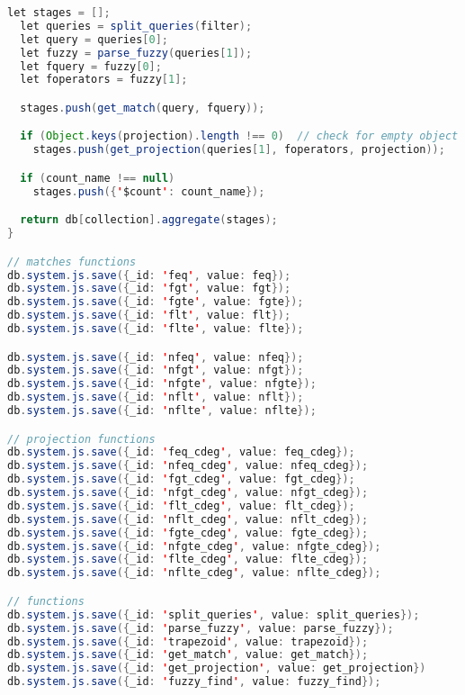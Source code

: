 \begin{lstlisting}[language=java, escapechar=|]
  let stages = [];
  let queries = split_queries(filter);
  let query = queries[0];
  let fuzzy = parse_fuzzy(queries[1]);
  let fquery = fuzzy[0];
  let foperators = fuzzy[1];

  stages.push(get_match(query, fquery));

  if (Object.keys(projection).length !== 0)  // check for empty object
    stages.push(get_projection(queries[1], foperators, projection));

  if (count_name !== null)
    stages.push({'$count': count_name});

  return db[collection].aggregate(stages);
}

// matches functions
db.system.js.save({_id: 'feq', value: feq});
db.system.js.save({_id: 'fgt', value: fgt});
db.system.js.save({_id: 'fgte', value: fgte});
db.system.js.save({_id: 'flt', value: flt});
db.system.js.save({_id: 'flte', value: flte});

db.system.js.save({_id: 'nfeq', value: nfeq});
db.system.js.save({_id: 'nfgt', value: nfgt});
db.system.js.save({_id: 'nfgte', value: nfgte});
db.system.js.save({_id: 'nflt', value: nflt});
db.system.js.save({_id: 'nflte', value: nflte});

// projection functions
db.system.js.save({_id: 'feq_cdeg', value: feq_cdeg});
db.system.js.save({_id: 'nfeq_cdeg', value: nfeq_cdeg});
db.system.js.save({_id: 'fgt_cdeg', value: fgt_cdeg});
db.system.js.save({_id: 'nfgt_cdeg', value: nfgt_cdeg});
db.system.js.save({_id: 'flt_cdeg', value: flt_cdeg});
db.system.js.save({_id: 'nflt_cdeg', value: nflt_cdeg});
db.system.js.save({_id: 'fgte_cdeg', value: fgte_cdeg});
db.system.js.save({_id: 'nfgte_cdeg', value: nfgte_cdeg});
db.system.js.save({_id: 'flte_cdeg', value: flte_cdeg});
db.system.js.save({_id: 'nflte_cdeg', value: nflte_cdeg});

// functions
db.system.js.save({_id: 'split_queries', value: split_queries});
db.system.js.save({_id: 'parse_fuzzy', value: parse_fuzzy});
db.system.js.save({_id: 'trapezoid', value: trapezoid});
db.system.js.save({_id: 'get_match', value: get_match});
db.system.js.save({_id: 'get_projection', value: get_projection})
db.system.js.save({_id: 'fuzzy_find', value: fuzzy_find});
\end{lstlisting}